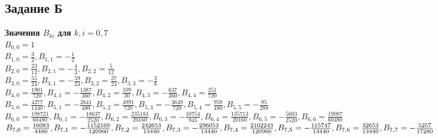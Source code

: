 \documentclass[
11pt,
master, %
subf, %
href, %
colorlinks=true, %
times, %
]{disser}
\begin{document}
\newpage
\subsection{Задание Б}
\textbf{Значения $B_{ki}$ для $k,i = \overline{0,7}$}\\
$B_{0, 0} =  1 $\\
$B_{1, 0} = \frac{3}{2}, B_{1, 1} =  -\frac{1}{2} $\\
$B_{2, 0} = \frac{23}{12} ,B_{2, 1} =  -\frac{4}{3}                 ,B_{2, 2} =  \frac{5}{12} $\\
$B_{3, 0} =  \frac{55}{24} ,B_{3, 1} = -\frac{59}{24}                 ,B_{3, 2} =  \frac{37}{24}                   ,B_{3, 3} =  -\frac{3}{8}$\\
$B_{4, 0} =  \frac{1901}{720} ,B_{4, 1} =  -\frac{1387}{360}                ,B_{4, 2} =  \frac{109}{30}                  ,B_{4, 3} =  -\frac{637}{360}                 ,B_{4, 4} =  \frac{251}{720}    $\\
$B_{5, 0} =  \frac{4277}{1440} ,B_{5, 1} =  -\frac{2641}{480}                 ,B_{5, 2} =  \frac{4991}{720}                  ,B_{5, 3} =  -\frac{3649}{720}                 ,B_{5, 4} =  \frac{959}{480}                  ,B_{5, 5} =  -\frac{95}{288}   $\\
$B_{6, 0} =  \frac{198721}{60480} ,B_{6, 1} =  -\frac{18637}{2520}                 ,B_{6, 2} =  \frac{235183}{20160}                  ,B_{6, 3} =  -\frac{10754}{945}                 ,B_{6, 4} =  \frac{135713}{20160}                  ,B_{6, 5} =  -\frac{5603}{2520}                 ,B_{6, 6} =  \frac{19087}{60480}      $\\
$B_{7, 0} =  \frac{16083}{4480}  ,B_{7, 1} =  -\frac{1152169}{120960}                 ,B_{7, 2} =  \frac{242653}{13440}                   ,B_{7, 3} =  -\frac{296053}{13440}                ,B_{7, 4} = \frac{2102243}{120960} ,B_{7, 5} = -\frac{115747}{13440}                  ,\\
B_{7, 6} =  \frac{32653}{13440}                 ,B_{7, 7} = -\frac{5257}{17280}   $\\
\end{document}

